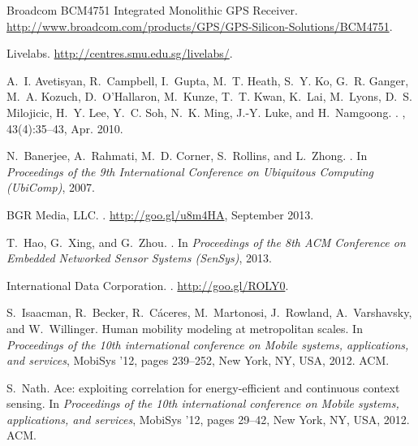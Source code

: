 
\begin{thebibliography}{10}

{Broadcom BCM4751 Integrated Monolithic GPS Receiver}.
\newblock
  \url{http://www.broadcom.com/products/GPS/GPS-Silicon-Solutions/BCM4751}.

Livelabs.
\newblock \url{http://centres.smu.edu.sg/livelabs/}.

A.~I. Avetisyan, R.~Campbell, I.~Gupta, M.~T. Heath, S.~Y. Ko, G.~R. Ganger,
  M.~A. Kozuch, D.~O'Hallaron, M.~Kunze, T.~T. Kwan, K.~Lai, M.~Lyons, D.~S.
  Milojicic, H.~Y. Lee, Y.~C. Soh, N.~K. Ming, J.-Y. Luke, and H.~Namgoong.
.
, 43(4):35--43, Apr. 2010.

N.~Banerjee, A.~Rahmati, M.~D. Corner, S.~Rollins, and L.~Zhong.
.
\newblock In {\em Proceedings of the 9th International Conference on Ubiquitous
  Computing (UbiComp)}, 2007.

{BGR Media, LLC}.
.
\newblock \url{http://goo.gl/u8m4HA}, September 2013.

T.~Hao, G.~Xing, and G.~Zhou.
.
\newblock In {\em Proceedings of the 8th ACM Conference on Embedded Networked
  Sensor Systems (SenSys)}, 2013.

{International Data Corporation}.
.
\newblock \url{http://goo.gl/ROLY0}.

S.~Isaacman, R.~Becker, R.~C\'{a}ceres, M.~Martonosi, J.~Rowland,
  A.~Varshavsky, and W.~Willinger.
\newblock Human mobility modeling at metropolitan scales.
\newblock In {\em Proceedings of the 10th international conference on Mobile
  systems, applications, and services}, MobiSys '12, pages 239--252, New York,
  NY, USA, 2012. ACM.

S.~Nath.
\newblock Ace: exploiting correlation for energy-efficient and continuous
  context sensing.
\newblock In {\em Proceedings of the 10th international conference on Mobile
  systems, applications, and services}, MobiSys '12, pages 29--42, New York,
  NY, USA, 2012. ACM.


\end{thebibliography}
